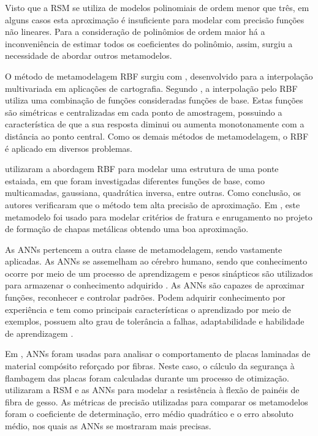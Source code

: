 Visto que a RSM se utiliza de modelos polinomiais de ordem menor que três, em alguns casos esta aproximação é insuficiente para modelar com precisão funções não lineares. Para a consideração de polinômios de ordem maior há a inconveniência de estimar todos os coeficientes do polinômio, assim, surgiu a necessidade de abordar outros metamodelos. 

O método de metamodelagem RBF surgiu com , desenvolvido para a interpolação multivariada em aplicações de cartografia. Segundo , a interpolação pelo RBF utiliza uma combinação de funções consideradas funções de base. Estas funções são simétricas e centralizadas em cada ponto de amostragem, possuindo a característica de que a sua resposta diminui ou aumenta monotonamente com a distância ao ponto central. Como os demais métodos de metamodelagem, o RBF é aplicado em diversos problemas. 

 utilizaram a abordagem RBF para modelar uma estrutura de uma ponte estaiada, em que foram investigadas diferentes funções de base, como multicamadas, gaussiana, quadrática inversa, entre outras. Como conclusão, os autores verificaram que o método tem alta precisão de aproximação. {\color{red}Em }, este metamodelo foi usado para modelar critérios de fratura e enrugamento no projeto de formação de chapas metálicas obtendo uma boa aproximação.

As ANNs pertencem a outra classe de metamodelagem, sendo vastamente aplicadas. As ANNs se assemelham ao cérebro humano, sendo que conhecimento ocorre por meio de um processo de aprendizagem e pesos sinápticos são utilizados para armazenar o conhecimento adquirido \cite{MENDONCA2016}. As ANNs são capazes de aproximar funções, reconhecer e controlar padrões. Podem adquirir conhecimento por experiência e tem como principais características o aprendizado por meio de exemplos, possuem alto grau de tolerância a falhas, adaptabilidade e habilidade de aprendizagem \cite{VILLAR2016}.

Em , ANNs foram usadas para analisar o comportamento de placas laminadas de material compósito reforçado por fibras. Neste caso, o cálculo da segurança à flambagem das placas foram calculadas durante um processo de otimização.  utilizaram a RSM e as ANNs para modelar a resistência {\color{red} à} flexão de painéis de fibra de gesso. As métricas de precisão utilizadas para comparar os metamodelos foram o coeficiente de determinação, erro médio quadrático e o erro absoluto médio, nos quais as ANNs se mostraram mais precisas.

